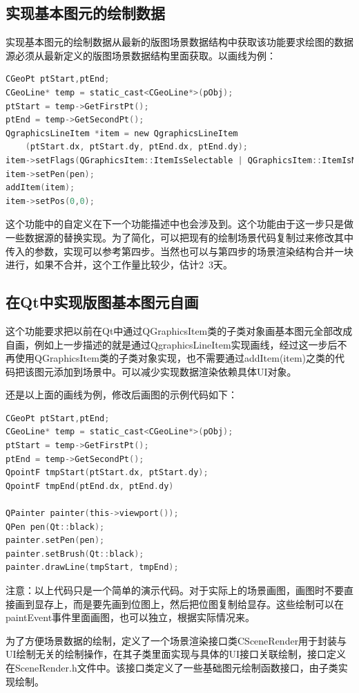 \subsection{实现基本图元的绘制数据} \label{SectArchTaskDataDraw} 
实现基本图元的绘制数据从最新的版图场景数据结构中获取该功能要求绘图的数据源必须从最新定义的版图场景数据结构里面获取。以画线为例：
\begin{lstlisting}[language=C]
CGeoPt ptStart,ptEnd;
CGeoLine* temp = static_cast<CGeoLine*>(pObj);
ptStart = temp->GetFirstPt();
ptEnd = temp->GetSecondPt();
QgraphicsLineItem *item = new QgraphicsLineItem 
    (ptStart.dx, ptStart.dy, ptEnd.dx, ptEnd.dy);
item->setFlags(QGraphicsItem::ItemIsSelectable | QGraphicsItem::ItemIsMovable);
item->setPen(pen);
addItem(item);
item->setPos(0,0);
\end{lstlisting}
这个功能中的自定义在下一个功能描述中也会涉及到。这个功能由于这一步只是做一些数据源的替换实现。为了简化，可以把现有的绘制场景代码复制过来修改其中传入的参数，实现可以参考第四步。当然也可以与第四步的场景渲染结构合并一块进行，如果不合并，这个工作量比较少，估计2~3天。

\subsection{在Qt中实现版图基本图元自画} \label{SectArchTaskQtDraw} 
这个功能要求把以前在Qt中通过QGraphicsItem类的子类对象画基本图元全部改成自画，例如上一步描述的就是通过QgraphicsLineItem实现画线，经过这一步后不再使用QGraphicsItem类的子类对象实现，也不需要通过addItem(item)之类的代码把该图元添加到场景中。可以减少实现数据渲染依赖具体UI对象。

还是以上面的画线为例，修改后画图的示例代码如下：
\begin{lstlisting}[language=C]
CGeoPt ptStart,ptEnd;
CGeoLine* temp = static_cast<CGeoLine*>(pObj);
ptStart = temp->GetFirstPt();
ptEnd = temp->GetSecondPt();
QpointF tmpStart(ptStart.dx, ptStart.dy);
QpointF tmpEnd(ptEnd.dx, ptEnd.dy)

QPainter painter(this->viewport());
QPen pen(Qt::black);    
painter.setPen(pen);
painter.setBrush(Qt::black);
painter.drawLine(tmpStart, tmpEnd);
\end{lstlisting}
注意：以上代码只是一个简单的演示代码。对于实际上的场景画图，画图时不要直接画到显存上，而是要先画到位图上，然后把位图复制给显存。这些绘制可以在paintEvent事件里面画图，也可以独立，根据实际情况来。

为了方便场景数据的绘制，定义了一个场景渲染接口类CSceneRender用于封装与UI绘制无关的绘制操作，在其子类里面实现与具体的UI接口关联绘制，接口定义在SceneRender.h文件中。该接口类定义了一些基础图元绘制函数接口，由子类实现绘制。

